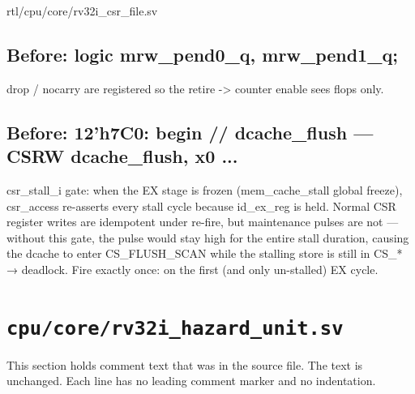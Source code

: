 \begin{relocated}{rtl/cpu/core/rv32i_csr_file.sv}
\subsection*{Before: logic       mrw\_pend0\_q, mrw\_pend1\_q;}

\begin{textblock}
drop / nocarry are registered so the retire -> counter enable sees flops only.
\end{textblock}

\subsection*{Before: 12'h7C0: begin  // dcache\_flush — CSRW dcache\_flush, x0 ...}

\begin{textblock}
csr_stall_i gate: when the EX stage is frozen (mem_cache_stall global
freeze), csr_access re-asserts every stall cycle because id_ex_reg is
held.  Normal CSR register writes are idempotent under re-fire, but
maintenance pulses are not — without this gate, the pulse would stay
high for the entire stall duration, causing the dcache to enter
CS_FLUSH_SCAN while the stalling store is still in CS_* → deadlock.
Fire exactly once: on the first (and only un-stalled) EX cycle.
\end{textblock}

\end{relocated}

\section{\texttt{cpu/core/rv32i\_hazard\_unit.sv}}\label{tm:mod:rv32i-hazard-unit}

This section holds comment text that was in the source file. The text is unchanged. Each line has no leading comment marker and no indentation.

